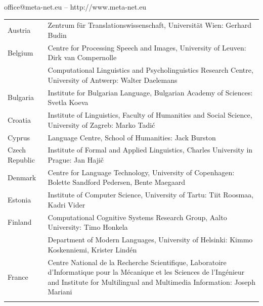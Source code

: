 \documentclass[]{../../metanetpaper}
\begin{document}
\vfill
\centerline{office@meta-net.eu -- http://www.meta-net.eu}

\cleardoublepage

\appendix
{}



  
\cleardoublepage

\label{metanetmembers}

\small

\begin{longtable}{@{}lp{137mm}@{}}
Austria & Zentrum für Translationswissenschaft, Universität Wien: Gerhard Budin\\ \addlinespace 
Belgium & Centre for Processing Speech and Images, University of Leuven: Dirk van Compernolle \\ \addlinespace
& Computational Linguistics and Psycholinguistics Research Centre, University of Antwerp: \newline Walter Daelemans\\ \addlinespace
Bulgaria & Institute for Bulgarian Language, Bulgarian Academy of Sciences: Svetla Koeva \\ \addlinespace
Croatia & Institute of Linguistics, Faculty of Humanities and Social Science, University of Zagreb: Marko Tadić \\ \addlinespace
Cyprus & Language Centre, School of Humanities: Jack Burston \\ \addlinespace
Czech Republic & Institute of Formal and Applied Linguistics, Charles University in Prague: Jan Hajič \\ \addlinespace
Denmark & Centre for Language Technology, University of Copenhagen: Bolette Sandford Pedersen, \newline Bente Maegaard\\ \addlinespace
Estonia & Institute of Computer Science, University of Tartu: Tiit Roosmaa, Kadri Vider\\ \addlinespace
Finland & Computational Cognitive Systems Research Group, Aalto University: Timo Honkela\\ \addlinespace
& Department of Modern Languages, University of Helsinki: Kimmo Koskenniemi, Krister Lindén \\ \addlinespace
France & Centre National de la Recherche Scientifique, Laboratoire d'Informatique pour la Mécanique et les Sciences de l'Ingénieur and Institute for Multilingual and Multimedia Information: Joseph Mariani \\ \addlinespace

\end{longtable}
\end{document}
